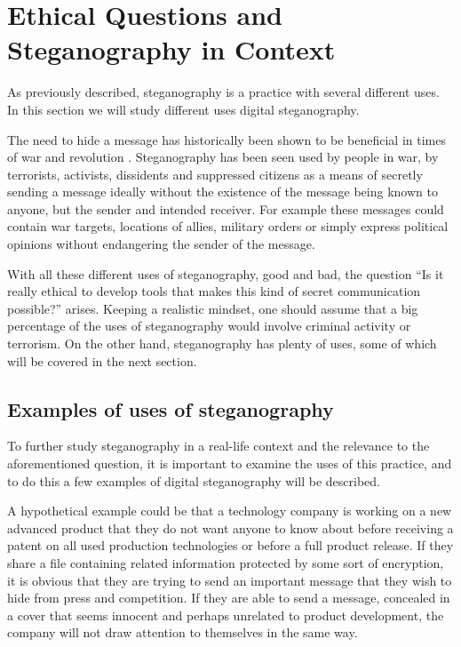 \section{Ethical Questions and Steganography in Context}
As previously described, steganography is a practice with several different uses.
In this section we will study different uses digital steganography.\vspace*{12pt}

\noindent The need to hide a message has historically been shown to be beneficial in times of war and revolution \citep{Singh2001}.
Steganography has been seen used by people in war, by terrorists, activists, dissidents and suppressed citizens as a means of secretly sending a message ideally without the existence of the message being known to anyone, but the sender and intended receiver.
For example these messages could contain war targets, locations of allies, military orders or simply express political opinions without endangering the sender of the message.

With all these different uses of steganography, good and bad, the question ``Is it really ethical to develop tools that makes this kind of secret communication possible?'' arises.
Keeping a realistic mindset, one should assume that a big percentage of the uses of steganography would involve criminal activity or terrorism.
On the other hand, steganography has plenty of uses, some of which will be covered in the next section.

\subsection{Examples of uses of steganography}
To further study steganography in a real-life context and the relevance to the aforementioned question, it is important to examine the uses of this practice, and to do this a few examples of digital steganography will be described.

A hypothetical example could be that a technology company is working on a new advanced product that they do not want anyone to know about before receiving a patent on all used production technologies or before a full product release.
If they share a file containing related information protected by some sort of encryption, it is obvious that they are trying to send an important message that they wish to hide from press and competition.
If they are able to send a message, concealed in a cover that seems innocent and perhaps unrelated to product development, the company will not draw attention to themselves in the same way.

